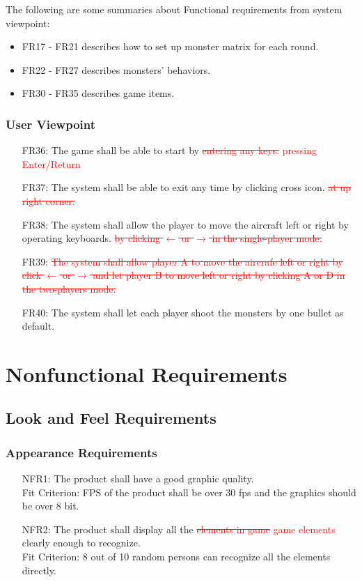 \documentclass[12pt]{article}
\begin{document}
The following are some summaries about Functional requirements from system viewpoint:
\begin{itemize}
\item FR17 - FR21 describes how to set up 
monster matrix for each round.
\item FR22 - FR27 describes monsters' behaviors.
\item FR30 - FR35 describes game items.
\end{itemize}
\subsubsection{User Viewpoint}
\begin{enumerate}
\item [FR36:]The game shall be able to start by \textcolor{red}{\st{entering any keys.} pressing Enter/Return}
\item [FR37:]The system shall be able to exit any time by clicking cross icon. \textcolor{red}{\st{at up right corner.}}
\item [FR38:]The system shall allow the player to move the aircraft left or right by operating keyboards. \textcolor{red}{\st{by clicking $\leftarrow$ or $\rightarrow$ in 
the single-player mode.}}
\item[FR39:] \textcolor{red}{\st{The system shall allow player A to move the aircrafe left or right by click $\leftarrow$ or $\rightarrow$ and let player B
to move left or right by clicking A or
D in the two-players mode.}}
\item [FR40:]The system shall let each player shoot the monsters by one bullet as default.
\end{enumerate}
\section{Nonfunctional Requirements}
\subsection{Look and Feel Requirements}
\subsubsection{Appearance Requirements}
\begin{itemize}
\item[NFR1:] The product shall have a good graphic quality.\\
Fit Criterion: FPS of the product shall be over 30 fps and the graphics should be over 8 bit.
\item[NFR2:] The product shall display all the \textcolor{red}{\st{elements in game} game elements} clearly enough to recognize.\\
Fit Criterion: 8 out of 10 random persons can recognize all the elements directly.
\end{itemize}
\end{document}
